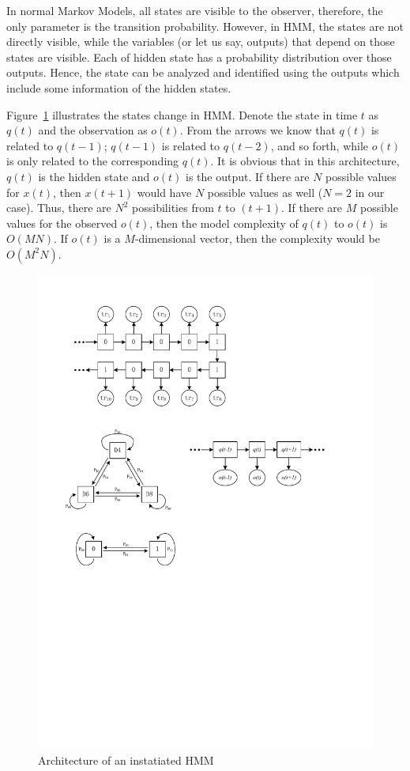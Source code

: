 \documentclass[conference]{IEEEtran}
\begin{document}
In normal Markov Models, all states are visible to the observer, therefore, the only parameter is the transition probability. However, in HMM, the states are not directly visible, while the variables (or let us say, outputs) that depend on those states are visible. Each of hidden state has a probability distribution over those outputs. Hence, the state can be analyzed and identified using the outputs which include some information of the hidden states.

Figure~\ref{fig:HMMmodel} illustrates the states change in HMM. Denote the state in time $t$ as $q(t)$ and the observation as $o(t)$. From the arrows we know that $q(t)$ is related to $q(t-1)$; $q(t-1)$ is related to $q(t-2)$, and so forth, while $o(t)$ is only related to the corresponding $q(t)$. It is obvious that in this architecture, $q(t)$ is the hidden state and $o(t)$ is the output. If there are $N$ possible values for $x(t)$, then $x(t+1)$ would have $N$ possible values as well ($N = 2$ in our case). Thus, there are $N^2$ possibilities from $t$ to $(t+1)$. If there are $M$ possible values for the observed $o(t)$, then the model complexity of $q(t)$ to $o(t)$ is $O(MN)$. If $o(t)$ is a $M$-dimensional vector, then the complexity would be $O(M^2N)$.
\begin{figure}[H]
	\centering
	\includegraphics{HMMmodel.pdf}
	\caption{Architecture of an instatiated HMM}
	\label{fig:HMMmodel}
\end{figure}
\end{document}
